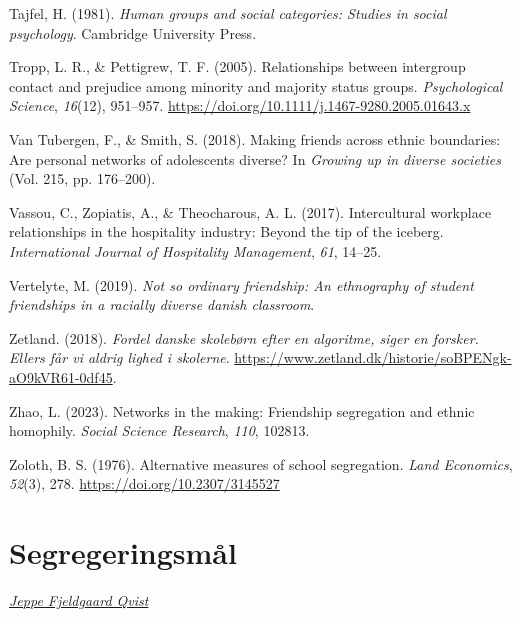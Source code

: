 \documentclass[
]{book}
\newlength{\cslhangindent}
\newenvironment{CSLReferences}[2] %
 {\begin{list}{}{%
  \setlength{\itemindent}{0pt}
  \setlength{\leftmargin}{0pt}
  \setlength{\parsep}{0pt}
  \ifodd #1
   \setlength{\leftmargin}{\cslhangindent}
   \setlength{\itemindent}{-1\cslhangindent}
  \fi
  \setlength{\itemsep}{#2\baselineskip}}}
 {\end{list}}
\begin{document}
\begin{CSLReferences}{1}{0}
Tajfel, H. (1981). \emph{Human groups and social categories: Studies in social psychology}. Cambridge University Press.

Tropp, L. R., \& Pettigrew, T. F. (2005). Relationships between intergroup contact and prejudice among minority and majority status groups. \emph{Psychological Science}, \emph{16}(12), 951--957. \url{https://doi.org/10.1111/j.1467-9280.2005.01643.x}

Van Tubergen, F., \& Smith, S. (2018). Making friends across ethnic boundaries: Are personal networks of adolescents diverse? In \emph{Growing up in diverse societies} (Vol. 215, pp. 176--200).

Vassou, C., Zopiatis, A., \& Theocharous, A. L. (2017). Intercultural workplace relationships in the hospitality industry: Beyond the tip of the iceberg. \emph{International Journal of Hospitality Management}, \emph{61}, 14--25.

Vertelyte, M. (2019). \emph{Not so ordinary friendship: An ethnography of student friendships in a racially diverse danish classroom}.

Zetland. (2018). \emph{Fordel danske skolebørn efter en algoritme, siger en forsker. Ellers får vi aldrig lighed i skolerne}. \url{https://www.zetland.dk/historie/soBPENgk-aO9kVR61-0df45}.

Zhao, L. (2023). Networks in the making: Friendship segregation and ethnic homophily. \emph{Social Science Research}, \emph{110}, 102813.

Zoloth, B. S. (1976). Alternative measures of school segregation. \emph{Land Economics}, \emph{52}(3), 278. \url{https://doi.org/10.2307/3145527}

\end{CSLReferences}

\appendix


\chapter{Segregeringsmål}\label{bilag1}

\thispagestyle{empty}

\emph{\href{https://vbn.aau.dk/da/persons/jeppefl}{Jeppe Fjeldgaard Qvist}}
\end{document}
